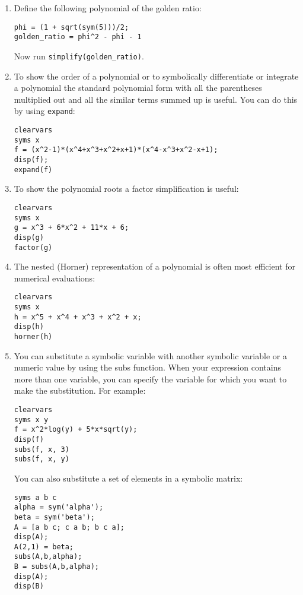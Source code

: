 \begin{enumerate}[resume]
  \item Define the following polynomial of the golden ratio:
\begin{lstlisting}[style=Matlab-editor,basicstyle=\mlttfamily\scriptsize]
phi = (1 + sqrt(sym(5)))/2;
golden_ratio = phi^2 - phi - 1
\end{lstlisting}
  Now run \texttt{simplify(golden\_ratio)}.
  \item To show the order of a polynomial or to symbolically differentiate or integrate a polynomial
    the standard polynomial form with all the parentheses multiplied out and all the similar terms summed up is useful.
  You can do this by using \texttt{expand}:
\begin{lstlisting}[style=Matlab-editor,basicstyle=\mlttfamily\scriptsize]
clearvars
syms x
f = (x^2-1)*(x^4+x^3+x^2+x+1)*(x^4-x^3+x^2-x+1);
disp(f);
expand(f)
\end{lstlisting}
  \item To show the polynomial roots a factor simplification is useful:
\begin{lstlisting}[style=Matlab-editor,basicstyle=\mlttfamily\scriptsize]
clearvars
syms x
g = x^3 + 6*x^2 + 11*x + 6;
disp(g)
factor(g)      
\end{lstlisting}
  \item The nested (Horner) representation of a polynomial is often most efficient for numerical evaluations:
\begin{lstlisting}[style=Matlab-editor,basicstyle=\mlttfamily\scriptsize]
clearvars
syms x
h = x^5 + x^4 + x^3 + x^2 + x;
disp(h)
horner(h)
\end{lstlisting}
  \item You can substitute a symbolic variable with another symbolic variable or a numeric value by using the subs function.
  When your expression contains more than one variable, you can specify the variable for which you want to make the substitution. 
  For example:
\begin{lstlisting}[style=Matlab-editor,basicstyle=\mlttfamily\scriptsize]
clearvars
syms x y
f = x^2*log(y) + 5*x*sqrt(y);
disp(f)
subs(f, x, 3)
subs(f, x, y)    
\end{lstlisting}
  You can also substitute a set of elements in a symbolic matrix:
\begin{lstlisting}[style=Matlab-editor,basicstyle=\mlttfamily\scriptsize]
syms a b c
alpha = sym('alpha');
beta = sym('beta');
A = [a b c; c a b; b c a];
disp(A);
A(2,1) = beta;
subs(A,b,alpha);
B = subs(A,b,alpha);
disp(A);
disp(B)       
\end{lstlisting}
\end{enumerate}

